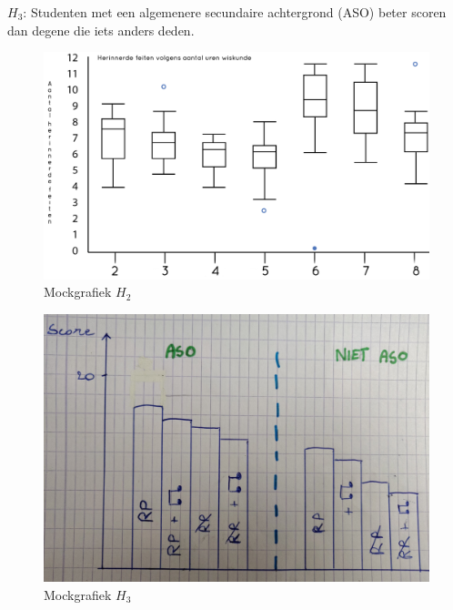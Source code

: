 \documentclass{hogent-article}
\begin{document}
	\textbf{$H_3$}: Studenten met een algemenere secundaire achtergrond (ASO) beter scoren dan degene die iets anders deden.
	\begin{figure}[H]
		\includegraphics[width=\linewidth]{img/mockboxplot.png}
		\caption{Mockgrafiek \textbf{$H_2$}}
	\end{figure}
	\begin{figure}[H]
		\includegraphics[width=\linewidth]{img/imgg2.jpg}
		\caption{Mockgrafiek \textbf{$H_3$}}
	\end{figure}
	
\end{document}
